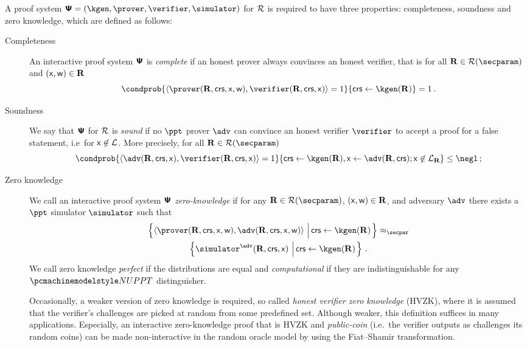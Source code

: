 \let\accentvec\vec \documentclass[runningheads,10pt]{llncs}
\begin{document}
A proof system $\proofsystem = (\kgen, \prover, \verifier, \simulator)$ for $\mathcal{R}$ is required to have three properties: completeness, soundness and zero knowledge, which are defined as follows:
\begin{description}
	\item[Completeness] An interactive proof system $\bm{\mathsf{\Psi}}$ is
			\emph{complete} if an honest prover always convinces an honest verifier,
			that is for all $\REL \in \RELGEN(\secparam)$ and $(\mathsf{x}, \mathsf{w}) \in \mathbf{R}$
	\[
		\condprob{\ip{\prover (\REL, \crs, \inp, \wit)}{\verifier (\REL, \crs,
		\inp)} = 1}{\crs \gets \kgen(\REL)} = 1\,.
	\]
	\item[Soundness] We say that $\bm{\mathsf{\Psi}}$ for $\mathcal{R}$ is \emph{sound} if
			no $\ppt$ prover $\adv$ can convince an honest verifier $\verifier$ to
			accept a proof for a false statement, i.e~for $\mathsf{x} \not\in\mathcal{L}$. More
			precisely, for all $\REL \in \RELGEN(\secparam)$
	\[
		\condprob{\ip{\adv(\REL, \crs, \inp)}{\verifier(\REL, \crs, \inp)} =
		1}{\crs \gets \kgen(\REL), \inp \gets \adv(\REL, \crs); \inp \not\in \LANG_\REL} \leq \negl\,;
	\]
	\item[Zero knowledge] We call an interactive proof system $\bm{\mathsf{\Psi}}$
		\emph{zero-knowledge} if for any $\REL \in \RELGEN(\secparam)$, $(\mathsf{x},
		\mathsf{w}) \in \mathbf{R}$, and adversary $\adv$ there exists a $\ppt$ simulator $\simulator$ such that
	\begin{multline*}
	  \left\{\ip{\prover(\REL, \crs, \inp, \wit)}{\adv(\REL, \crs, \inp, \wit)}
	\,\left|\, \crs \gets \kgen(\REL)\COMMENT{, (\inp, \wit) \gets \adv(\REL,
\crs)}\vphantom{\simulator^\adv}\right.\right\} \approx_\secpar
		\\
		\left\{\simulator^{\adv}(\REL, \crs, \inp)\,\left|\, \crs \gets
\kgen(\REL)\COMMENT{, (\inp, \wit) \gets \adv(\REL,
\crs)}\vphantom{\simulator^\adv}\right.\right\}\,.  
\end{multline*}
	We call zero knowledge \emph{perfect} if the distributions are equal and
	\emph{computational} if they are indistinguishable for any $\nuppt$ distinguisher.

	Occasionally, a weaker version of zero knowledge is required, so called
	\emph{honest verifier zero knowledge} (HVZK), where it is assumed that the
	verifier's challenges are picked at random from some predefined set.
	Although weaker, this definition suffices in many applications. Especially,
	an interactive zero-knowledge proof that is HVZK and \emph{public-coin}
	(i.e.~the verifier outputs as challenges its random coins) can be made
	non-interactive in the random oracle model by using the Fiat--Shamir
	transformation.
\end{description}
	
\end{document}
